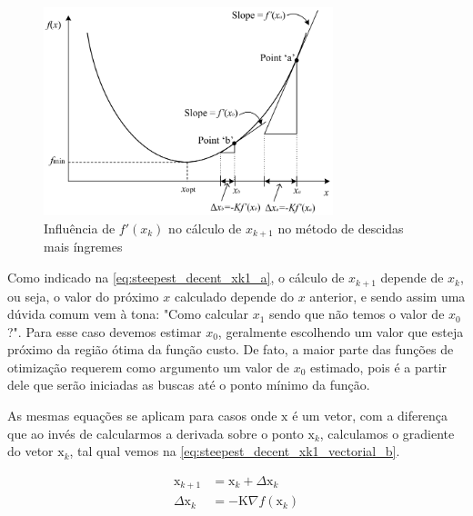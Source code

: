 \begin{figure}
	\begin{center}
		\includegraphics[width=0.75\textwidth]{./5_images/fig_steepest_decent_slope.png} 
		\caption{Influência de $f'(x_k)$ no cálculo de $x_{k+1}$ no método de descidas mais íngremes}
		\label{fig:steepest_decent_slope}
	\end{center}
\end{figure}

Como indicado na \cref{eq:steepest_decent_xk1_a}, o cálculo de $x_{k+1}$ depende
de $x_k$, ou seja, o valor do próximo $x$ calculado depende do $x$ anterior, e
sendo assim uma dúvida comum vem à tona: "Como calcular $x_1$ sendo que não temos
o valor de $x_0$?". Para esse caso devemos estimar $x_0$, geralmente
escolhendo um valor que esteja próximo da região ótima da função custo. De fato,
a maior parte das funções de otimização requerem como argumento um valor de $x_0$
estimado, pois é a partir dele que serão iniciadas as buscas até o ponto mínimo
da função.

As mesmas equações se aplicam para casos onde $\mathrm{x}$ é um vetor, com a diferença que
ao invés de calcularmos a derivada sobre o ponto $\mathrm{x}_k$, calculamos o gradiente
do vetor $\mathrm{x}_k$, tal qual vemos na \cref{eq:steepest_decent_xk1_vectorial_b}.

\begin{subequations}
	\begin{align}
		\mathrm{x}_{k+1} &= \mathrm{x}_k + \Delta \mathrm{x}_k			\label{eq:steepest_decent_xk1_vectorial_a} \\ 
		\Delta \mathrm{x}_k &= \mathrm{-K} \nabla f(\mathrm{x}_k)		\label{eq:steepest_decent_xk1_vectorial_b}
	\end{align}
\end{subequations}

